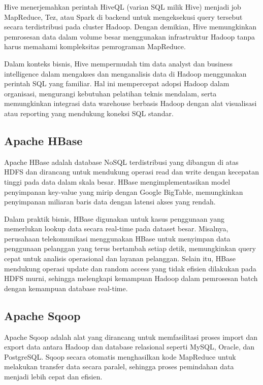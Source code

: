 Hive menerjemahkan perintah HiveQL (varian SQL milik Hive) menjadi job MapReduce, Tez, atau Spark di backend untuk mengeksekusi query tersebut secara terdistribusi pada cluster Hadoop. Dengan demikian, Hive memungkinkan pemrosesan data dalam volume besar menggunakan infrastruktur Hadoop tanpa harus memahami kompleksitas pemrograman MapReduce.

Dalam konteks bisnis, Hive mempermudah tim data analyst dan business intelligence dalam mengakses dan menganalisis data di Hadoop menggunakan perintah SQL yang familiar. Hal ini mempercepat adopsi Hadoop dalam organisasi, mengurangi kebutuhan pelatihan teknis mendalam, serta memungkinkan integrasi data warehouse berbasis Hadoop dengan alat visualisasi atau reporting yang mendukung koneksi SQL standar.

\subsection{Apache HBase}

Apache HBase adalah database NoSQL terdistribusi yang dibangun di atas HDFS dan dirancang untuk mendukung operasi read dan write dengan kecepatan tinggi pada data dalam skala besar. HBase mengimplementasikan model penyimpanan key-value yang mirip dengan Google BigTable, memungkinkan penyimpanan miliaran baris data dengan latensi akses yang rendah.

Dalam praktik bisnis, HBase digunakan untuk kasus penggunaan yang memerlukan lookup data secara real-time pada dataset besar. Misalnya, perusahaan telekomunikasi menggunakan HBase untuk menyimpan data penggunaan pelanggan yang terus bertambah setiap detik, memungkinkan query cepat untuk analisis operasional dan layanan pelanggan. Selain itu, HBase mendukung operasi update dan random access yang tidak efisien dilakukan pada HDFS murni, sehingga melengkapi kemampuan Hadoop dalam pemrosesan batch dengan kemampuan database real-time.

\subsection{Apache Sqoop}

Apache Sqoop adalah alat yang dirancang untuk memfasilitasi proses import dan export data antara Hadoop dan database relasional seperti MySQL, Oracle, dan PostgreSQL. Sqoop secara otomatis menghasilkan kode MapReduce untuk melakukan transfer data secara paralel, sehingga proses pemindahan data menjadi lebih cepat dan efisien.

